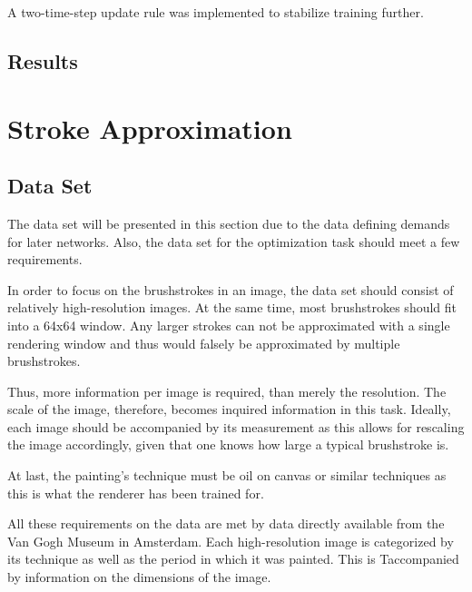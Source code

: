 A two-time-step update rule was implemented to stabilize training further.

\subsection{Results}


\section{Stroke Approximation}

\subsection{Data Set}
The data set will be presented in this section due to the data defining demands for later networks.
Also, the data set for the optimization task should meet a few requirements.

In order to focus on the brushstrokes in an image, the data set should consist of relatively high-resolution images.
At the same time, most brushstrokes should fit into a 64x64 window.
Any larger strokes can not be approximated with a single rendering window and thus would falsely be approximated by multiple brushstrokes.

Thus, more information per image is required, than merely the resolution.
The scale of the image, therefore, becomes inquired information in this task.
Ideally, each image should be accompanied by its measurement as this allows for rescaling the image accordingly, given that one knows how large a typical brushstroke is.

At last, the painting's technique must be oil on canvas or similar techniques as this is what the renderer has been trained for.

All these requirements on the data are met by data directly available from the Van Gogh Museum in Amsterdam.
Each high-resolution image is categorized by its technique as well as the period in which it was painted.
This is Taccompanied by information on the dimensions of the image.

